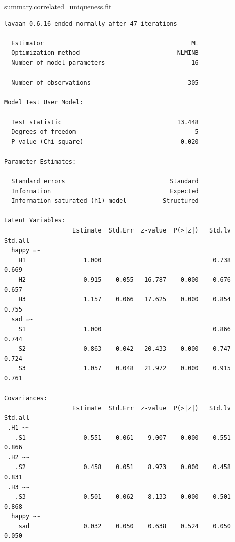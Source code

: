 \documentclass[
  letterpaper,
  DIV=11,
  numbers=noendperiod]{scrreprt}
\newenvironment{Shaded}{\begin{snugshade}}{\end{snugshade}}
\newcommand{\NormalTok}[1]{\textcolor[rgb]{0.00,0.23,0.31}{#1}}
\begin{document}
\begin{Shaded}
\begin{Highlighting}[]
\NormalTok{summary.correlated\_uniqueness.fit}
\end{Highlighting}
\end{Shaded}

\begin{verbatim}
lavaan 0.6.16 ended normally after 47 iterations

  Estimator                                         ML
  Optimization method                           NLMINB
  Number of model parameters                        16

  Number of observations                           305

Model Test User Model:
                                                      
  Test statistic                                13.448
  Degrees of freedom                                 5
  P-value (Chi-square)                           0.020

Parameter Estimates:

  Standard errors                             Standard
  Information                                 Expected
  Information saturated (h1) model          Structured

Latent Variables:
                   Estimate  Std.Err  z-value  P(>|z|)   Std.lv  Std.all
  happy =~                                                              
    H1                1.000                               0.738    0.669
    H2                0.915    0.055   16.787    0.000    0.676    0.657
    H3                1.157    0.066   17.625    0.000    0.854    0.755
  sad =~                                                                
    S1                1.000                               0.866    0.744
    S2                0.863    0.042   20.433    0.000    0.747    0.724
    S3                1.057    0.048   21.972    0.000    0.915    0.761

Covariances:
                   Estimate  Std.Err  z-value  P(>|z|)   Std.lv  Std.all
 .H1 ~~                                                                 
   .S1                0.551    0.061    9.007    0.000    0.551    0.866
 .H2 ~~                                                                 
   .S2                0.458    0.051    8.973    0.000    0.458    0.831
 .H3 ~~                                                                 
   .S3                0.501    0.062    8.133    0.000    0.501    0.868
  happy ~~                                                              
    sad               0.032    0.050    0.638    0.524    0.050    0.050


\end{verbatim}
\end{document}
